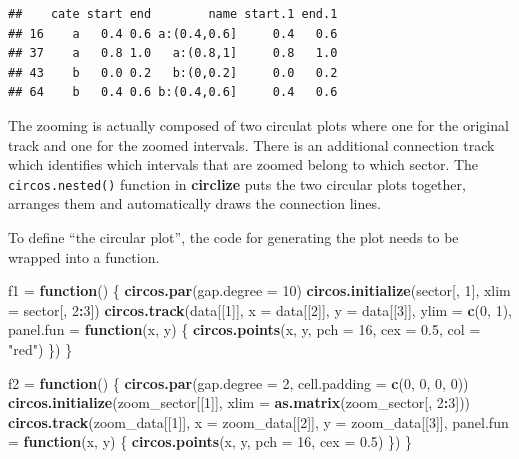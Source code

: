 \documentclass[]{book}
\newenvironment{Shaded}{\begin{snugshade}}{\end{snugshade}}
\newcommand{\KeywordTok}[1]{\textcolor[rgb]{0.13,0.29,0.53}{\textbf{#1}}}
\newcommand{\DataTypeTok}[1]{\textcolor[rgb]{0.13,0.29,0.53}{#1}}
\newcommand{\DecValTok}[1]{\textcolor[rgb]{0.00,0.00,0.81}{#1}}
\newcommand{\FloatTok}[1]{\textcolor[rgb]{0.00,0.00,0.81}{#1}}
\newcommand{\StringTok}[1]{\textcolor[rgb]{0.31,0.60,0.02}{#1}}
\newcommand{\ControlFlowTok}[1]{\textcolor[rgb]{0.13,0.29,0.53}{\textbf{#1}}}
\newcommand{\OperatorTok}[1]{\textcolor[rgb]{0.81,0.36,0.00}{\textbf{#1}}}
\newcommand{\NormalTok}[1]{#1}
\begin{document}
\begin{verbatim}
##    cate start end        name start.1 end.1
## 16    a   0.4 0.6 a:(0.4,0.6]     0.4   0.6
## 37    a   0.8 1.0   a:(0.8,1]     0.8   1.0
## 43    b   0.0 0.2   b:(0,0.2]     0.0   0.2
## 64    b   0.4 0.6 b:(0.4,0.6]     0.4   0.6
\end{verbatim}

The zooming is actually composed of two circulat plots where one for the
original track and one for the zoomed intervals. There is an additional
connection track which identifies which intervals that are zoomed belong
to which sector. The \texttt{circos.nested()} function in
\textbf{circlize} puts the two circular plots together, arranges them
and automatically draws the connection lines.

To define ``the circular plot'', the code for generating the plot needs
to be wrapped into a function.

\begin{Shaded}
\begin{Highlighting}[]
\NormalTok{f1 =}\StringTok{ }\ControlFlowTok{function}\NormalTok{() \{}
    \KeywordTok{circos.par}\NormalTok{(}\DataTypeTok{gap.degree =} \DecValTok{10}\NormalTok{)}
    \KeywordTok{circos.initialize}\NormalTok{(sector[, }\DecValTok{1}\NormalTok{], }\DataTypeTok{xlim =}\NormalTok{ sector[, }\DecValTok{2}\OperatorTok{:}\DecValTok{3}\NormalTok{])}
    \KeywordTok{circos.track}\NormalTok{(data[[}\DecValTok{1}\NormalTok{]], }\DataTypeTok{x =}\NormalTok{ data[[}\DecValTok{2}\NormalTok{]], }\DataTypeTok{y =}\NormalTok{ data[[}\DecValTok{3}\NormalTok{]], }\DataTypeTok{ylim =} \KeywordTok{c}\NormalTok{(}\DecValTok{0}\NormalTok{, }\DecValTok{1}\NormalTok{), }
        \DataTypeTok{panel.fun =} \ControlFlowTok{function}\NormalTok{(x, y) \{}
            \KeywordTok{circos.points}\NormalTok{(x, y, }\DataTypeTok{pch =} \DecValTok{16}\NormalTok{, }\DataTypeTok{cex =} \FloatTok{0.5}\NormalTok{, }\DataTypeTok{col =} \StringTok{"red"}\NormalTok{)}
\NormalTok{    \})}
\NormalTok{\}}

\NormalTok{f2 =}\StringTok{ }\ControlFlowTok{function}\NormalTok{() \{}
    \KeywordTok{circos.par}\NormalTok{(}\DataTypeTok{gap.degree =} \DecValTok{2}\NormalTok{, }\DataTypeTok{cell.padding =} \KeywordTok{c}\NormalTok{(}\DecValTok{0}\NormalTok{, }\DecValTok{0}\NormalTok{, }\DecValTok{0}\NormalTok{, }\DecValTok{0}\NormalTok{))}
    \KeywordTok{circos.initialize}\NormalTok{(zoom_sector[[}\DecValTok{1}\NormalTok{]], }\DataTypeTok{xlim =} \KeywordTok{as.matrix}\NormalTok{(zoom_sector[, }\DecValTok{2}\OperatorTok{:}\DecValTok{3}\NormalTok{]))}
    \KeywordTok{circos.track}\NormalTok{(zoom_data[[}\DecValTok{1}\NormalTok{]], }\DataTypeTok{x =}\NormalTok{ zoom_data[[}\DecValTok{2}\NormalTok{]], }\DataTypeTok{y =}\NormalTok{ zoom_data[[}\DecValTok{3}\NormalTok{]], }
        \DataTypeTok{panel.fun =} \ControlFlowTok{function}\NormalTok{(x, y) \{}
            \KeywordTok{circos.points}\NormalTok{(x, y, }\DataTypeTok{pch =} \DecValTok{16}\NormalTok{, }\DataTypeTok{cex =} \FloatTok{0.5}\NormalTok{)}
\NormalTok{        \})}
\NormalTok{\}}
\end{Highlighting}
\end{Shaded}
\end{document}
